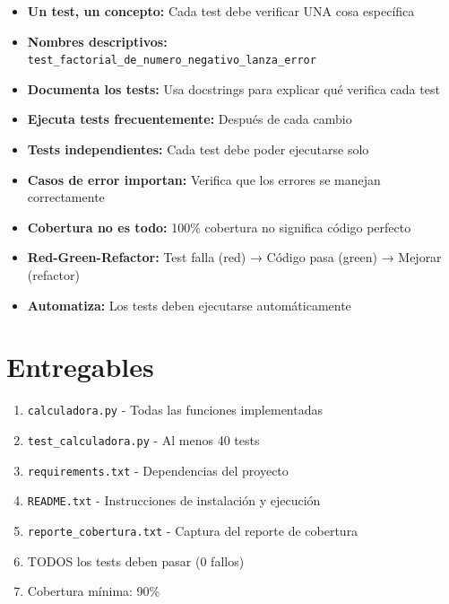 \documentclass[12pt,a4paper]{article}
\begin{document}
\begin{itemize}[leftmargin=*]
    \item \textbf{Un test, un concepto:} Cada test debe verificar UNA cosa específica
    
    \item \textbf{Nombres descriptivos:} \texttt{test\_factorial\_de\_numero\_negativo\_lanza\_error}
    
    \item \textbf{Documenta los tests:} Usa docstrings para explicar qué verifica cada test
    
    \item \textbf{Ejecuta tests frecuentemente:} Después de cada cambio
    
    \item \textbf{Tests independientes:} Cada test debe poder ejecutarse solo
    
    \item \textbf{Casos de error importan:} Verifica que los errores se manejan correctamente
    
    \item \textbf{Cobertura no es todo:} 100\% cobertura no significa código perfecto
    
    \item \textbf{Red-Green-Refactor:} Test falla (red) → Código pasa (green) → Mejorar (refactor)
    
    \item \textbf{Automatiza:} Los tests deben ejecutarse automáticamente
\end{itemize}

\section{Entregables}

\begin{enumerate}[leftmargin=*]
    \item \texttt{calculadora.py} - Todas las funciones implementadas
    \item \texttt{test\_calculadora.py} - Al menos 40 tests
    \item \texttt{requirements.txt} - Dependencias del proyecto
    \item \texttt{README.txt} - Instrucciones de instalación y ejecución
    \item \texttt{reporte\_cobertura.txt} - Captura del reporte de cobertura
    \item TODOS los tests deben pasar (0 fallos)
    \item Cobertura mínima: 90\%
\end{enumerate}
\end{document}
